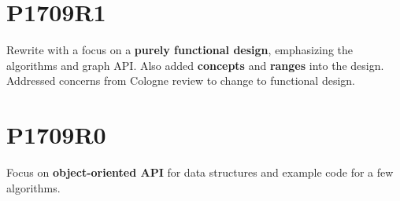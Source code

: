 \section*{P1709R1}
Rewrite with a focus on a \textbf{purely functional design}, emphasizing the algorithms and graph API. Also added \textbf{concepts} and \textbf{ranges} into the design. Addressed concerns from Cologne review to change to functional design.

\section*{P1709R0}
Focus on \textbf{object-oriented API} for data structures and example code for a few algorithms.
